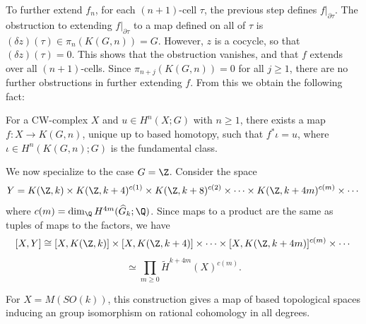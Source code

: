 To further extend $f_n$, for each $(n+1)$-cell $\tau$, the previous step defines $f|_{\partial\tau}$. The obstruction to extending $f|_{\partial \tau}$ to a map defined on all of $\tau$ is $(\delta z)(\tau)\in \pi_n(K(G,n))=G$. However, $z$ is a cocycle, so that $(\delta z)( \tau)=0$. This shows that the obstruction vanishes, and that $f$ extends over all $(n+1)$-cells. Since $\pi_{n+j}(K(G,n))=0$ for all $j\geq 1$, there are no further obstructions in further extending $f$. From this we obtain the following fact:
\begin{proposition}
    For a CW-complex $X$ and $u\in H^n(X;G)$ with $n\geq 1$, there exists a map $f:X\to K(G,n)$, unique up to based homotopy, such that $f^*\iota=u$, where $\iota\in H^n(K(G,n);G)$ is the fundamental class.
\end{proposition}
We now specialize to the case $G=\Z$. Consider the space 
\[Y=K(\Z,k)\times K(\Z, k+4)^{c(1)}\times  K(\Z, k+8)^{c(2)}\times\cdots\times K(\Z, k+4m)^{c(m)}\times\cdots\]
where $c(m)=\dim_\Q H^{4m}(\widehat G_k;\Q)$. Since maps to a product are the same as tuples of maps to the factors, we
have
\[[X,Y]\cong [X,K(\Z,k)]\times[X,K(\Z,k+4)]\times\cdots \times [X,K(\Z, k+4m)]^{c(m)}\times\cdots\]
\[\simeq \prod_{m\geq 0} \widetilde H^{k+4m}(X)^{c(m)}. \]
\begin{proposition}\label{result?}
    For $X=M(SO(k))$, this construction gives a map of based topological spaces inducing an group isomorphism on rational cohomology in all degrees. 
\end{proposition}
